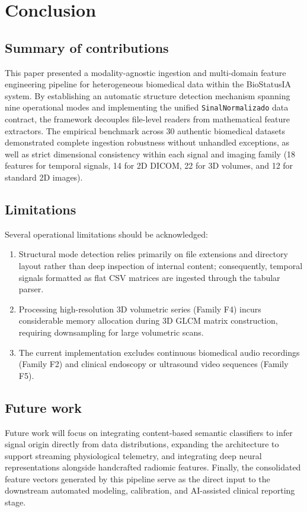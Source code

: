 \section{Conclusion}
\label{sec:conclusao}

\subsection{Summary of contributions}
This paper presented a modality-agnostic ingestion and multi-domain feature engineering pipeline for heterogeneous biomedical data within the BioStatusIA system. By establishing an automatic structure detection mechanism spanning nine operational modes and implementing the unified \texttt{SinalNormalizado} data contract, the framework decouples file-level readers from mathematical feature extractors. The empirical benchmark across 30 authentic biomedical datasets demonstrated complete ingestion robustness without unhandled exceptions, as well as strict dimensional consistency within each signal and imaging family (18 features for temporal signals, 14 for 2D DICOM, 22 for 3D volumes, and 12 for standard 2D images).

\subsection{Limitations}
Several operational limitations should be acknowledged:
\begin{enumerate}
    \item Structural mode detection relies primarily on file extensions and directory layout rather than deep inspection of internal content; consequently, temporal signals formatted as flat CSV matrices are ingested through the tabular parser.
    \item Processing high-resolution 3D volumetric series (Family F4) incurs considerable memory allocation during 3D GLCM matrix construction, requiring downsampling for large volumetric scans.
    \item The current implementation excludes continuous biomedical audio recordings (Family F2) and clinical endoscopy or ultrasound video sequences (Family F5).
\end{enumerate}

\subsection{Future work}
Future work will focus on integrating content-based semantic classifiers to infer signal origin directly from data distributions, expanding the architecture to support streaming physiological telemetry, and integrating deep neural representations alongside handcrafted radiomic features. Finally, the consolidated feature vectors generated by this pipeline serve as the direct input to the downstream automated modeling, calibration, and AI-assisted clinical reporting stage.
